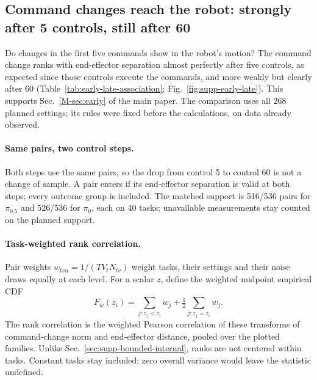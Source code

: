 \subsection{Command changes reach the robot: strongly after 5 controls, still after 60}
\label{sec:early-late-association}
Do changes in the first five commands show in the robot's motion? The command change ranks with end-effector separation almost perfectly after five controls, as expected since those controls execute the commands, and more weakly but clearly after 60 (Table~\ref{tab:early-late-association}; Fig.~\ref{fig:supp-early-late}). This supports Sec.~\ref*{M-sec:early} of the main paper. The comparison uses all 268 planned settings; its rules were fixed before the calculations, on data already observed.

\paragraph{Same pairs, two control steps.}
Both steps use the same pairs, so the drop from control 5 to control 60 is not a change of sample. A pair enters if its end-effector separation is valid at both steps; every outcome group is included. The matched support is 516/536 pairs for $\pi_{0.5}$ and 526/536 for $\pi_0$, each on 40 tasks; unavailable measurements stay counted on the planned support.

\paragraph{Task-weighted rank correlation.}
Pair weights $w_{tvn}=1/(T V_t N_{tv})$ weight tasks, their settings and their noise draws equally at each level. For a scalar $z$, define the weighted midpoint empirical CDF
\begin{equation}
F_w(z_i)=\sum_{j:z_j<z_i}w_j+\tfrac12\sum_{j:z_j=z_i}w_j.
\end{equation}
The rank correlation is the weighted Pearson correlation of these transforms of command-change norm and end-effector distance, pooled over the plotted families. Unlike Sec.~\ref{sec:supp-bounded-internal}, ranks are not centered within tasks. Constant tasks stay included; zero overall variance would leave the statistic undefined.

